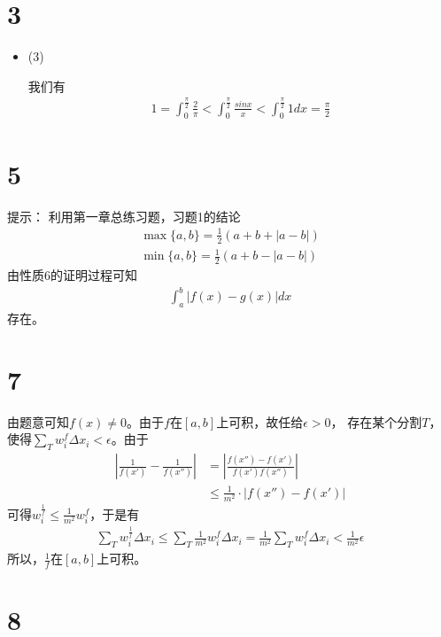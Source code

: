 \documentclass{article}
\begin{document}
\section*{3}

\begin{itemize}
  \item (3)

        我们有
        \begin{align*}
          1 = \int_{0}^{\frac{\pi}{2}} \frac{2}{\pi}
          < \int_{0}^{\frac{\pi}{2}} \frac{sin x}{x}
          < \int_{0}^{\frac{\pi}{2}} 1 dx
          = \frac{\pi}{2}
        \end{align*}
\end{itemize}

\section*{5}

提示：
利用第一章总练习题，习题1的结论
\begin{align*}
  \max\{a, b\} = \frac{1}{2}(a + b + |a - b|) \\
  \min\{a, b\} = \frac{1}{2}(a + b - |a - b|)
\end{align*}
由性质6的证明过程可知
\begin{align*}
  \int_{a}^{b} |f(x) - g(x)| dx
\end{align*}
存在。

\section*{7}

由题意可知$f(x) \neq 0$。由于$f$在$[a, b]$上可积，故任给$\epsilon > 0$，
存在某个分割$T$，使得$\sum \limits_{T} w_i^f \Delta x_i < \epsilon$。由于
\begin{align*}
  \left|\frac{1}{f(x')} - \frac{1}{f(x'')}\right|
   & = \left|\frac{f(x'') - f(x')}{f(x')f(x'')}\right|    \\
   & \leq \frac{1}{m^2} \cdot \left|f(x'') - f(x')\right|
\end{align*}
可得$w_i^{\frac{1}{f}} \leq \frac{1}{m^2}w_i^f$，于是有
\begin{align*}
  \sum \limits_{T} w_i^{\frac{1}{f}} \Delta x_i
  \leq \sum \limits_{T} \frac{1}{m^2} w_i^f \Delta x_i
  = \frac{1}{m^2} \sum \limits_{T} w_i^f \Delta x_i
  < \frac{1}{m^2} \epsilon
\end{align*}
所以，$\frac{1}{f}$在$[a, b]$上可积。

\section*{8}
\end{document}
